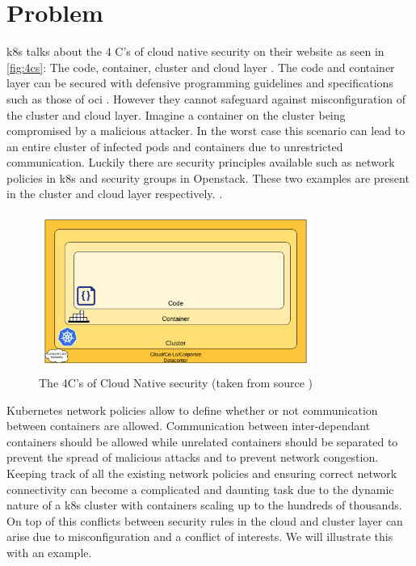 \section{Problem} \label{sec:problem}
\acrlong{k8s} talks about the 4 C’s of cloud native security on their website as seen in \autoref{fig:4cs}: The code, container, cluster and cloud layer \cite{4cs}. The code and container layer can be secured with defensive programming guidelines \cite{defensiveprogramming} and specifications such as those of \acrshort{oci} \cite{OCI}. However they cannot safeguard against misconfiguration of the cluster and cloud layer. Imagine a container on the cluster being compromised by a malicious attacker. In the worst case this scenario can lead to an entire cluster of infected pods and containers due to unrestricted communication. Luckily there are security principles available such as network policies  in \acrshort{k8s} and security groups in Openstack. These two examples are present in the cluster and cloud layer respectively. \cite{nps} \cite{secgroups}.
\\[10pt]

\begin{figure}[htbp]
  \centering
  \includegraphics[width=0.8\textwidth]{images/4c.png}
  \caption{The 4C's of Cloud Native security (taken from source \cite{4cs})}
  \label{fig:4cs}
\end{figure}

Kubernetes network policies allow to define whether or not communication between containers are allowed. Communication between inter-dependant containers should be allowed while unrelated containers should be separated to prevent the spread of malicious attacks and to prevent network congestion. Keeping track of all the existing network policies and ensuring correct network connectivity can become a complicated and daunting task due to the dynamic nature of a \acrshort{k8s} cluster with containers scaling up to the hundreds of thousands. On top of this conflicts between security rules in the cloud and cluster layer can arise due to misconfiguration and a conflict of interests. We will illustrate this with an example.
\\[10pt]

